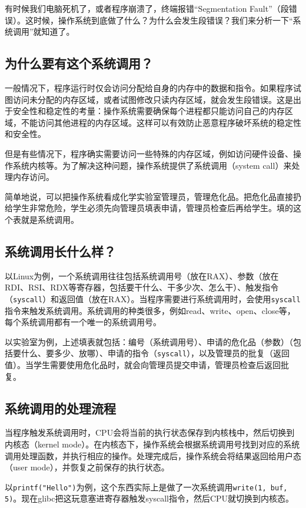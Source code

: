 \documentclass[../main.tex]{subfiles}
\begin{document}
有时候我们电脑死机了，或者程序崩溃了，终端报错“Segmentation Fault”（段错误）。这时候，操作系统到底做了什么？为什么会发生段错误？我们来分析一下“系统调用”就知道了。

\subsection{为什么要有这个系统调用？}

一般情况下，程序运行时仅会访问分配给自身的内存中的数据和指令。如果程序试图访问未分配的内存区域，或者试图修改只读内存区域，就会发生段错误。这是出于安全性和稳定性的考量：操作系统需要确保每个进程都只能访问自己的内存区域，不能访问其他进程的内存区域。这样可以有效防止恶意程序破坏系统的稳定性和安全性。

但是有些情况下，程序确实需要访问一些特殊的内存区域，例如访问硬件设备、操作系统内核等。为了解决这种问题，操作系统提供了系统调用（system call）来处理内存访问。

简单地说，可以把操作系统看成化学实验室管理员，管理危化品。把危化品直接扔给学生非常危险，学生必须先向管理员填表申请，管理员检查后再给学生。填的这个表就是系统调用。

\subsection{系统调用长什么样？}

以Linux为例，一个系统调用往往包括系统调用号（放在RAX）、参数（放在RDI、RSI、RDX等寄存器，包括要干什么、干多少次、怎么干）、触发指令（\texttt{syscall}）和返回值（放在RAX）。当程序需要进行系统调用时，会使用\texttt{syscall}指令来触发系统调用。系统调用的种类很多，例如read、write、open、close等，每个系统调用都有一个唯一的系统调用号。

以实验室为例，上述填表就包括：编号（系统调用号）、申请的危化品（参数）（包括要什么、要多少、放哪）、申请的指令（\texttt{syscall}），以及管理员的批复（返回值）。当学生需要使用危化品时，就会向管理员提交申请，管理员检查后返回批复。

\subsection{系统调用的处理流程}

当程序触发系统调用时，CPU会将当前的执行状态保存到内核栈中，然后切换到内核态（kernel mode）。在内核态下，操作系统会根据系统调用号找到对应的系统调用处理函数，并执行相应的操作。处理完成后，操作系统会将结果返回给用户态（user mode），并恢复之前保存的执行状态。

以\texttt{printf("Hello")}为例，这个东西实际上是做了一次系统调用\texttt{write(1, buf, 5)}。现在glibc把这玩意塞进寄存器触发syscall指令，然后CPU就切换到内核态。
\end{document}
